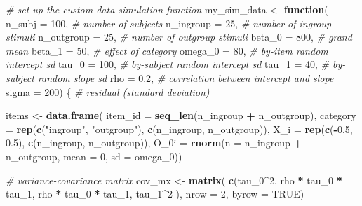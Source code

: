 \documentclass[
  english,
  doc,floatsintext]{apa6}
\newenvironment{Shaded}{\begin{snugshade}}{\end{snugshade}}
\newcommand{\CommentTok}[1]{\textcolor[rgb]{0.56,0.35,0.01}{\textit{#1}}}
\newcommand{\ControlFlowTok}[1]{\textcolor[rgb]{0.13,0.29,0.53}{\textbf{#1}}}
\newcommand{\DataTypeTok}[1]{\textcolor[rgb]{0.13,0.29,0.53}{#1}}
\newcommand{\DecValTok}[1]{\textcolor[rgb]{0.00,0.00,0.81}{#1}}
\newcommand{\FloatTok}[1]{\textcolor[rgb]{0.00,0.00,0.81}{#1}}
\newcommand{\KeywordTok}[1]{\textcolor[rgb]{0.13,0.29,0.53}{\textbf{#1}}}
\newcommand{\NormalTok}[1]{#1}
\newcommand{\OperatorTok}[1]{\textcolor[rgb]{0.81,0.36,0.00}{\textbf{#1}}}
\newcommand{\OtherTok}[1]{\textcolor[rgb]{0.56,0.35,0.01}{#1}}
\newcommand{\StringTok}[1]{\textcolor[rgb]{0.31,0.60,0.02}{#1}}
\begin{document}
\begin{Shaded}
\begin{Highlighting}[]
\CommentTok{# set up the custom data simulation function}
\NormalTok{my_sim_data <-}\StringTok{ }\ControlFlowTok{function}\NormalTok{(}
  \DataTypeTok{n_subj     =} \DecValTok{100}\NormalTok{,   }\CommentTok{# number of subjects}
  \DataTypeTok{n_ingroup  =}  \DecValTok{25}\NormalTok{,   }\CommentTok{# number of ingroup stimuli}
  \DataTypeTok{n_outgroup =}  \DecValTok{25}\NormalTok{,   }\CommentTok{# number of outgroup stimuli}
  \DataTypeTok{beta_0     =} \DecValTok{800}\NormalTok{,   }\CommentTok{# grand mean}
  \DataTypeTok{beta_1     =}  \DecValTok{50}\NormalTok{,   }\CommentTok{# effect of category}
  \DataTypeTok{omega_0    =}  \DecValTok{80}\NormalTok{,   }\CommentTok{# by-item random intercept sd}
  \DataTypeTok{tau_0      =} \DecValTok{100}\NormalTok{,   }\CommentTok{# by-subject random intercept sd}
  \DataTypeTok{tau_1      =}  \DecValTok{40}\NormalTok{,   }\CommentTok{# by-subject random slope sd}
  \DataTypeTok{rho        =} \FloatTok{0.2}\NormalTok{,   }\CommentTok{# correlation between intercept and slope}
  \DataTypeTok{sigma      =} \DecValTok{200}\NormalTok{) \{ }\CommentTok{# residual (standard deviation)}

\NormalTok{  items <-}\StringTok{ }\KeywordTok{data.frame}\NormalTok{(}
    \DataTypeTok{item_id =} \KeywordTok{seq_len}\NormalTok{(n_ingroup }\OperatorTok{+}\StringTok{ }\NormalTok{n_outgroup),}
    \DataTypeTok{category =} \KeywordTok{rep}\NormalTok{(}\KeywordTok{c}\NormalTok{(}\StringTok{"ingroup"}\NormalTok{, }\StringTok{"outgroup"}\NormalTok{), }\KeywordTok{c}\NormalTok{(n_ingroup, n_outgroup)),}
    \DataTypeTok{X_i =} \KeywordTok{rep}\NormalTok{(}\KeywordTok{c}\NormalTok{(}\OperatorTok{-}\FloatTok{0.5}\NormalTok{, }\FloatTok{0.5}\NormalTok{), }\KeywordTok{c}\NormalTok{(n_ingroup, n_outgroup)),}
    \DataTypeTok{O_0i =} \KeywordTok{rnorm}\NormalTok{(}\DataTypeTok{n =}\NormalTok{ n_ingroup }\OperatorTok{+}\StringTok{ }\NormalTok{n_outgroup, }\DataTypeTok{mean =} \DecValTok{0}\NormalTok{, }\DataTypeTok{sd =}\NormalTok{ omega_}\DecValTok{0}\NormalTok{))}

  \CommentTok{# variance-covariance matrix}
\NormalTok{  cov_mx  <-}\StringTok{ }\KeywordTok{matrix}\NormalTok{(}
    \KeywordTok{c}\NormalTok{(tau_}\DecValTok{0}\OperatorTok{^}\DecValTok{2}\NormalTok{,             rho }\OperatorTok{*}\StringTok{ }\NormalTok{tau_}\DecValTok{0} \OperatorTok{*}\StringTok{ }\NormalTok{tau_}\DecValTok{1}\NormalTok{,}
\NormalTok{      rho }\OperatorTok{*}\StringTok{ }\NormalTok{tau_}\DecValTok{0} \OperatorTok{*}\StringTok{ }\NormalTok{tau_}\DecValTok{1}\NormalTok{, tau_}\DecValTok{1}\OperatorTok{^}\DecValTok{2}\NormalTok{            ),}
    \DataTypeTok{nrow =} \DecValTok{2}\NormalTok{, }\DataTypeTok{byrow =} \OtherTok{TRUE}\NormalTok{)}


\end{Highlighting}
\end{Shaded}
\end{document}

